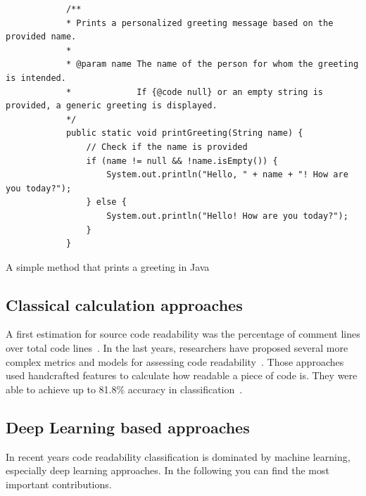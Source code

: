 \documentclass[%
class=scrreprt,
chapterprefix=false,%
open=right,%
twoside=false,%
paper=a4,%
logofile={Logo\_zentral\_farbig\_EN.png},%
thesistype=master,%
UKenglish,%
]{se2thesis}
\begin{document}
	
	\begin{listing}[!ht]
		\begin{verbatim}
			/**
			* Prints a personalized greeting message based on the provided name.
			*
			* @param name The name of the person for whom the greeting is intended.
			*             If {@code null} or an empty string is provided, a generic greeting is displayed.
			*/
			public static void printGreeting(String name) {
				// Check if the name is provided
				if (name != null && !name.isEmpty()) {
					System.out.println("Hello, " + name + "! How are you today?");
				} else {
					System.out.println("Hello! How are you today?");
				}
			}
		\end{verbatim}
		\caption{A simple method that prints a greeting in Java}
		\label{lst:print-greeting}
	\end{listing}
	

	
	
%	
%	
%	
	
\subsection{Classical calculation approaches} \label{Classical calculation approaches}
	A first estimation for source code readability was the percentage of comment lines over total code lines~\cite{aggarwal2002integrated}. In the last years, researchers have proposed several more complex metrics and models for assessing code readability~\cite{buse2009learning, posnett2011simpler, dorn2012general, scalabrino2018comprehensive}.
	Those approaches used handcrafted features to calculate how readable a piece of code is. They were able to achieve up to 81.8\% accuracy in classification~\cite{scalabrino2018comprehensive}.
	
\subsection{Deep Learning based approaches} \label{(Deep) Learning based approaches}
	In recent years code readability classification is dominated by machine learning, especially deep learning approaches. In the following you can find the most important contributions.
	
\end{document}
